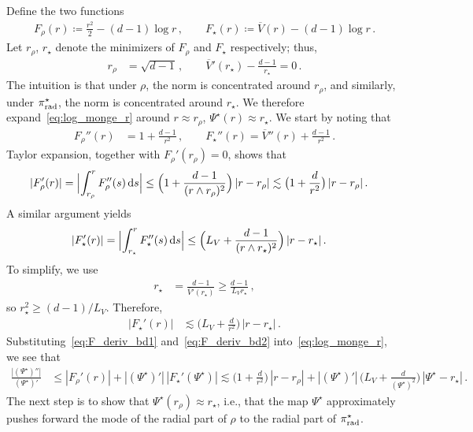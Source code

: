 \documentclass[twoside]{article}
\newcommand{\1}{\mathds{1}}
\newcommand*{\defeq}{\coloneqq}
\newcommand*{\rd}{\mathrm{d}}
\newcommand*{\dd}{\, \rd}
\newcommand{\pirad}{\pi_{\rm rad}}
\theoremstyle{plain}
\theoremstyle{definition}
\theoremstyle{remark}
\begin{document}
Define the two functions
\begin{align*}
    F_\rho(r) \defeq \frac{r^2}{2} - (d-1) \log r\,, \qquad F_\star(r) \defeq \overline V(r) - (d-1)\log r\,.
\end{align*}
Let $r_\rho$, $r_\star$ denote the minimizers of $F_\rho$ and $F_\star$ respectively; thus,
\begin{align*}
    r_\rho
    &= \sqrt{d-1}\,, \qquad \overline V'(r_\star) - \frac{d-1}{r_\star} = 0\,.
\end{align*}
The intuition is that under $\rho$, the norm is concentrated around $r_\rho$, and similarly, under $\pirad^\star$, the norm is concentrated around $r_\star$.
We therefore expand~\eqref{eq:log_monge_r} around $r \approx r_\rho$, $\Psi^\star(r) \approx r_\star$.
We start by noting that
\begin{align*}
    F_\rho''(r)
    &= 1 + \frac{d-1}{r^2}\,, \qquad F_\star''(r) = \overline V''(r) + \frac{d-1}{r^2}\,.
\end{align*}
Taylor expansion, together with $F_\rho'(r_\rho) = 0$, shows that
\begin{align}\label{eq:F_deriv_bd1}
    |F_\rho'(r)|
    &= \Bigl\lvert\int_{r_\rho}^r F_\rho''(s) \dd s\Bigr\vert
    \le \Bigl(1 + \frac{d-1}{(r \wedge r_\rho)^2}\Bigr)\,|r-r_\rho|
    \lesssim \bigl(1 + \frac{d}{r^2}\bigr)\,|r-r_\rho|\,.
\end{align}
A similar argument yields
\begin{align*}
    |F_\star'(r)|
    &= \Bigl\lvert \int_{r_\star}^r F_\star''(s)\dd s\Bigr\rvert
    \le \Bigl(L_V + \frac{d-1}{(r \wedge r_\star)^2}\Bigr)\,|r-r_\star|\,.
\end{align*}
To simplify, we use
\begin{align*}
    r_\star
    &= \frac{d-1}{\overline V'(r_\star)}
    \ge \frac{d-1}{L_V r_\star}\,,
\end{align*}
so $r_\star^2 \ge (d-1)/L_V$. Therefore,
\begin{align}\label{eq:F_deriv_bd2}
    |F_\star'(r)|
    &\lesssim \bigl(L_V + \frac{d}{r^2}\bigr)\,|r-r_\star|\,.
\end{align}
Substituting~\eqref{eq:F_deriv_bd1} and~\eqref{eq:F_deriv_bd2} into~\eqref{eq:log_monge_r}, we see that
\begin{align}\label{eq:intermed_calc}
    \frac{|(\Psi^\star)''|}{(\Psi^\star)'}
    &\le |F_\rho'(r)| + |(\Psi^\star)'|\,|F_\star'(\Psi^\star)|
    \lesssim \bigl(1 + \frac{d}{r^2}\bigr)\,|r-r_\rho| + |(\Psi^\star)'|\, \bigl(L_V + \frac{d}{(\Psi^\star)^2}\bigr)\,|\Psi^\star - r_\star|\,.
\end{align}
The next step is to show that $\Psi^\star(r_\rho) \approx r_\star$, i.e., that the map $\Psi^\star$ approximately pushes forward the mode of the radial part of $\rho$ to the radial part of $\pirad^\star$.
\end{document}
